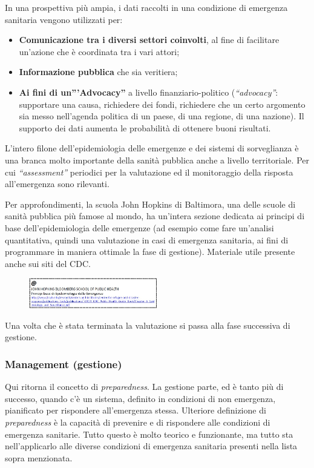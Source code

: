 In una prospettiva più ampia, i dati raccolti in una condizione di
emergenza sanitaria vengono utilizzati per:

\begin{itemize}
\item
  \textbf{Comunicazione tra i diversi settori coinvolti}, al fine di
  facilitare un'azione che è coordinata tra i vari attori;
\item
  \textbf{Informazione pubblica} che sia veritiera;
\item
  \textbf{Ai fini di un'''Advocacy''} a livello finanziario-politico
  (\emph{``advocacy''}: supportare una causa, richiedere dei fondi,
  richiedere che un certo argomento sia messo nell'agenda politica di un
  paese, di una regione, di una nazione). Il supporto dei dati aumenta
  le probabilità di ottenere buoni risultati.
\end{itemize}

L'intero filone dell'epidemiologia delle emergenze e dei sistemi di
sorveglianza è una branca molto importante della sanità pubblica anche a
livello territoriale. Per cui \emph{``assessment''} periodici per la
valutazione ed il monitoraggio della risposta all'emergenza sono
rilevanti.

Per approfondimenti, la scuola John Hopkins di Baltimora, una delle
scuole di sanità pubblica più famose al mondo, ha un'intera sezione
dedicata ai principi di base dell'epidemiologia delle emergenze (ad
esempio come fare un'analisi quantitativa, quindi una valutazione in
casi di emergenza sanitaria, ai fini di programmare in maniera ottimale
la fase di gestione). Materiale utile presente anche sui siti del CDC.

\begin{figure}[!ht]
\centering
	\includegraphics[width=0.5\textwidth]{26/image3.jpeg}
	\end{figure}

Una volta che è stata terminata la valutazione si passa alla fase
successiva di gestione.

\subsubsection{Management (gestione)}

Qui ritorna il concetto di \emph{preparedness}. La gestione parte, ed è
tanto più di successo, quando c'è un sistema, definito in condizioni di
non emergenza, pianificato per rispondere all'emergenza stessa.
Ulteriore definizione di \emph{preparedness} è la capacità di prevenire
e di rispondere alle condizioni di emergenza sanitarie. Tutto questo è
molto teorico e funzionante, ma tutto sta nell'applicarlo alle diverse
condizioni di emergenza sanitaria presenti nella lista sopra menzionata.

